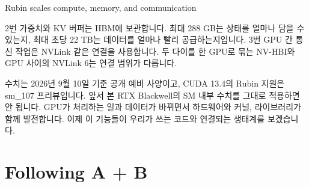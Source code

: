 \documentclass[aspectratio=169,t]{beamer}
\begin{document}
\begin{frame}{Rubin scales compute, memory, and communication}
{  2번 가중치와 KV 버퍼는 HBM에 보관합니다. 최대 288 GB는 상태를 얼마나 담을 수 있는지, 최대 초당 22 TB는 데이터를 얼마나 빨리 공급하는지입니다. 3번 GPU 간 통신 작업은 NVLink 같은 연결을 사용합니다. 두 다이를 한 GPU로 묶는 NV-HBI와 GPU 사이의 NVLink 6는 연결 범위가 다릅니다.

  수치는 2026년 9월 10일 기준 공개 예비 사양이고, CUDA 13.4의 Rubin 지원은 sm\_107 프리뷰입니다. 앞서 본 RTX Blackwell의 SM 내부 수치를 그대로 적용하면 안 됩니다. GPU가 처리하는 일과 데이터가 바뀌면서 하드웨어와 커널, 라이브러리가 함께 발전합니다. 이제 이 기능들이 우리가 쓰는 코드와 연결되는 생태계를 보겠습니다.}
\end{frame}

\section{Following A + B}
\end{document}
